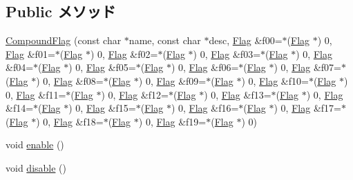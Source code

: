 \subsection*{Public メソッド}
\begin{DoxyCompactItemize}
\item 
\hyperlink{classDebug_1_1CompoundFlag_ab5d2bb6f27100008c07c280759bb2340}{CompoundFlag} (const char $\ast$name, const char $\ast$desc, \hyperlink{classDebug_1_1Flag}{Flag} \&f00=$\ast$(\hyperlink{classDebug_1_1Flag}{Flag} $\ast$) 0, \hyperlink{classDebug_1_1Flag}{Flag} \&f01=$\ast$(\hyperlink{classDebug_1_1Flag}{Flag} $\ast$) 0, \hyperlink{classDebug_1_1Flag}{Flag} \&f02=$\ast$(\hyperlink{classDebug_1_1Flag}{Flag} $\ast$) 0, \hyperlink{classDebug_1_1Flag}{Flag} \&f03=$\ast$(\hyperlink{classDebug_1_1Flag}{Flag} $\ast$) 0, \hyperlink{classDebug_1_1Flag}{Flag} \&f04=$\ast$(\hyperlink{classDebug_1_1Flag}{Flag} $\ast$) 0, \hyperlink{classDebug_1_1Flag}{Flag} \&f05=$\ast$(\hyperlink{classDebug_1_1Flag}{Flag} $\ast$) 0, \hyperlink{classDebug_1_1Flag}{Flag} \&f06=$\ast$(\hyperlink{classDebug_1_1Flag}{Flag} $\ast$) 0, \hyperlink{classDebug_1_1Flag}{Flag} \&f07=$\ast$(\hyperlink{classDebug_1_1Flag}{Flag} $\ast$) 0, \hyperlink{classDebug_1_1Flag}{Flag} \&f08=$\ast$(\hyperlink{classDebug_1_1Flag}{Flag} $\ast$) 0, \hyperlink{classDebug_1_1Flag}{Flag} \&f09=$\ast$(\hyperlink{classDebug_1_1Flag}{Flag} $\ast$) 0, \hyperlink{classDebug_1_1Flag}{Flag} \&f10=$\ast$(\hyperlink{classDebug_1_1Flag}{Flag} $\ast$) 0, \hyperlink{classDebug_1_1Flag}{Flag} \&f11=$\ast$(\hyperlink{classDebug_1_1Flag}{Flag} $\ast$) 0, \hyperlink{classDebug_1_1Flag}{Flag} \&f12=$\ast$(\hyperlink{classDebug_1_1Flag}{Flag} $\ast$) 0, \hyperlink{classDebug_1_1Flag}{Flag} \&f13=$\ast$(\hyperlink{classDebug_1_1Flag}{Flag} $\ast$) 0, \hyperlink{classDebug_1_1Flag}{Flag} \&f14=$\ast$(\hyperlink{classDebug_1_1Flag}{Flag} $\ast$) 0, \hyperlink{classDebug_1_1Flag}{Flag} \&f15=$\ast$(\hyperlink{classDebug_1_1Flag}{Flag} $\ast$) 0, \hyperlink{classDebug_1_1Flag}{Flag} \&f16=$\ast$(\hyperlink{classDebug_1_1Flag}{Flag} $\ast$) 0, \hyperlink{classDebug_1_1Flag}{Flag} \&f17=$\ast$(\hyperlink{classDebug_1_1Flag}{Flag} $\ast$) 0, \hyperlink{classDebug_1_1Flag}{Flag} \&f18=$\ast$(\hyperlink{classDebug_1_1Flag}{Flag} $\ast$) 0, \hyperlink{classDebug_1_1Flag}{Flag} \&f19=$\ast$(\hyperlink{classDebug_1_1Flag}{Flag} $\ast$) 0)
\item 
void \hyperlink{classDebug_1_1CompoundFlag_a486f22824bd83c5308a0d70ffac6f758}{enable} ()
\item 
void \hyperlink{classDebug_1_1CompoundFlag_a8cfbbe53c1cf6e3054736daea3044c0f}{disable} ()
\end{DoxyCompactItemize}
